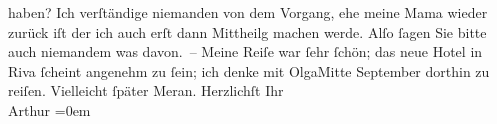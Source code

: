 \begin{ledgroupsized}[t]{13cm}
               haben?\pend
           \pstart
           Ich verſtändige niemanden von dem Vorgang, ehe meine Mama wieder zurück iſt der ich auch erſt dann Mittheilg
               machen werde. Alſo ſagen Sie bitte auch niemandem was davon. –\pend
           \pstart
           Meine Reiſe war ſehr ſchön; das neue Hotel in Riva ſcheint angenehm zu ſein; ich
               denke {\pb}mit OlgaMitte September dorthin zu reiſen. Vielleicht ſpäter Meran.\pend
           \pstart
           Herzlichſt Ihr{\\[\baselineskip]}\spacefill\mbox{Arthur}\pend
           \leftskip=0em{}
         
         \endnumbering{}\end{ledgroupsized}  \newcommand{\dateiname}{L01313}\newcommand{\titel}{Arthur Schnitzler an Richard Beer-Hofmann, 23. 8. 1903}\newcommand{\editorInnen}{Martin Anton Müller und Gerd-Hermann Susen}
      